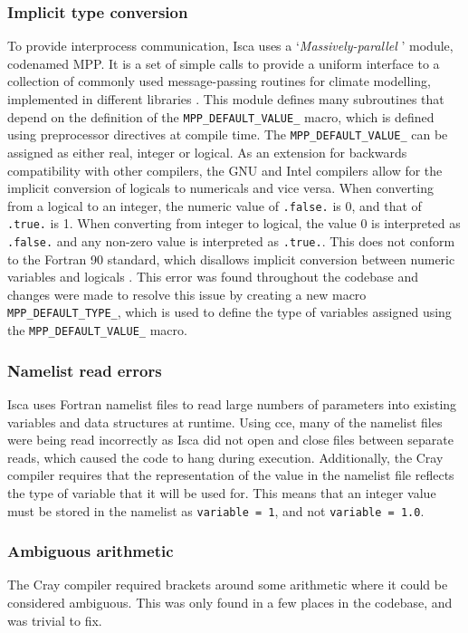 \documentclass[a4paper,11pt]{report}
\begin{document}
\subsubsection{Implicit type conversion}
To provide interprocess communication, Isca uses a `\textit{Massively-parallel} ' module, codenamed MPP. It is a set of simple calls to provide a uniform interface to a collection of commonly used message-passing routines for climate modelling, implemented in different libraries \cite{balaji2002fms}. This module defines many subroutines that depend on the definition of the \texttt{MPP\_DEFAULT\_VALUE\_} macro, which is defined using preprocessor directives at compile time. The \texttt{MPP\_DEFAULT\_VALUE\_} can be assigned as either real, integer or logical. As an extension for backwards compatibility with other compilers, the GNU and Intel compilers allow for the implicit conversion of logicals to numericals and vice versa. When converting from a logical to an integer, the numeric value of \texttt{.false.} is 0, and that of \texttt{.true.} is 1. When converting from integer to logical, the value 0 is interpreted as \texttt{.false.} and any non-zero value is interpreted as \texttt{.true.}. This does not conform to the Fortran 90 standard, which disallows implicit conversion between numeric variables and logicals \cite{fortran1991standard,gnu2019conversion}. This error was found throughout the codebase and changes were made to resolve this issue by creating a new macro \texttt{MPP\_DEFAULT\_TYPE\_}, which is used to define the type of variables assigned using the \texttt{MPP\_DEFAULT\_VALUE\_} macro.

\subsubsection{Namelist read errors}
Isca uses Fortran namelist files to read large numbers of parameters into existing variables and data structures at runtime. Using \gls{cce}, many of the namelist files were being read incorrectly as Isca did not open and close files between separate reads, which caused the code to hang during execution. Additionally, the Cray compiler requires that the representation of the value in the namelist file reflects the type of variable that it will be used for. This means that an integer value must be stored in the namelist as \texttt{variable = 1}, and not \texttt{variable = 1.0}.

\subsubsection{Ambiguous arithmetic}
The Cray compiler required brackets around some arithmetic where it could be considered ambiguous. This was only found in a few places in the codebase, and was trivial to fix. 
\end{document}
